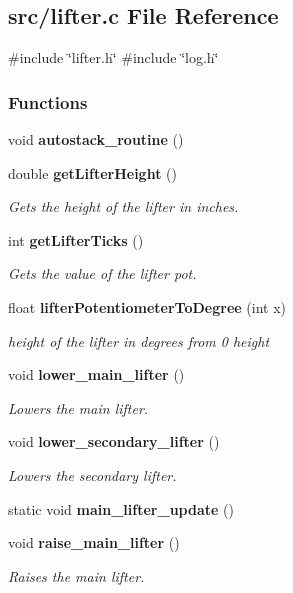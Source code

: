 \subsection{src/lifter.c File Reference}
\label{lifter_8c}
{\ttfamily \#include \char`\"{}lifter.\+h\char`\"{}}\newline
{\ttfamily \#include \char`\"{}log.\+h\char`\"{}}\newline
\subsubsection*{Functions}
\begin{DoxyCompactItemize}
\item 
void \textbf{ autostack\+\_\+routine} ()
\item 
double \textbf{ get\+Lifter\+Height} ()
\begin{DoxyCompactList}\small\item\em Gets the height of the lifter in inches. \end{DoxyCompactList}\item 
int \textbf{ get\+Lifter\+Ticks} ()
\begin{DoxyCompactList}\small\item\em Gets the value of the lifter pot. \end{DoxyCompactList}\item 
float \textbf{ lifter\+Potentiometer\+To\+Degree} (int x)
\begin{DoxyCompactList}\small\item\em height of the lifter in degrees from 0 height \end{DoxyCompactList}\item 
void \textbf{ lower\+\_\+main\+\_\+lifter} ()
\begin{DoxyCompactList}\small\item\em Lowers the main lifter. \end{DoxyCompactList}\item 
void \textbf{ lower\+\_\+secondary\+\_\+lifter} ()
\begin{DoxyCompactList}\small\item\em Lowers the secondary lifter. \end{DoxyCompactList}\item 
static void \textbf{ main\+\_\+lifter\+\_\+update} ()
\item 
void \textbf{ raise\+\_\+main\+\_\+lifter} ()
\begin{DoxyCompactList}\small\item\em Raises the main lifter. \end{DoxyCompactList}\item 

\end{DoxyCompactItemize}

